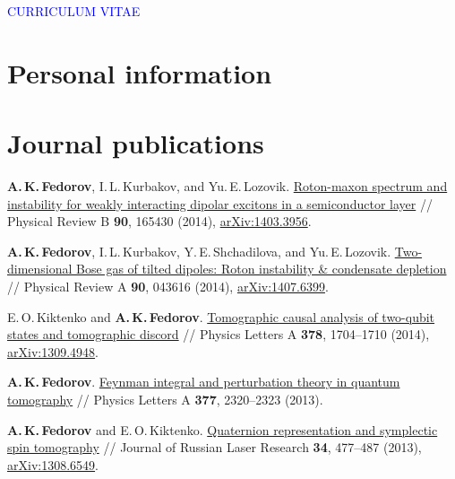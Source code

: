 \documentclass[10pt,a4paper,sans]{moderncv}
\begin{document}
\begin{center}
\Large
\textcolor{blue}{CURRICULUM VITAE}
\end{center}

\section{Personal information}


\section{Journal publications}

	{\textbf{A.\,K.\,Fedorov}, I.\,L.\,Kurbakov, and Yu.\,E.\,Lozovik. 
	{\textcolor{blue}{\href{http://dx.doi.org/10.1103/PhysRevB.90.165430}{Roton-maxon spectrum and instability for weakly interacting dipolar excitons in a semiconductor layer}}}
	// Physical Review B \textbf{90}, 165430 (2014),
	{\textcolor{blue}{\href{http://arxiv.org/abs/1403.3956}{arXiv:1403.3956}}}.}
	
	{\textbf{A.\,K.\,Fedorov}, I.\,L.\,Kurbakov, Y.\,E.\,Shchadilova, and Yu.\,E.\,Lozovik.
	{\textcolor{blue}{\href{http://dx.doi.org/10.1103/PhysRevA.90.043616}{Two-dimensional Bose gas of tilted dipoles: Roton instability \& condensate depletion}}}
	// Physical Review A \textbf{90}, 043616 (2014),
	{\textcolor{blue}{\href{http://arxiv.org/abs/1407.6399}{arXiv:1407.6399}}}.}

	{E.\,O.\,Kiktenko and \textbf{A.\,K.\,Fedorov}. 
	{\textcolor{blue}{\href{http://dx.doi.org/10.1016/j.physleta.2014.04.036}{Tomographic causal analysis of two-qubit states and tomographic discord}}} //  
	Physics Letters A \textbf{378},  1704--1710 (2014), {\textcolor{blue}{\href{http://arxiv.org/abs/1309.4948}{arXiv:1309.4948}}}.}

	{\textbf{A.\,K.\,Fedorov}. 
	{\textcolor{blue}{\href{http://dx.doi.org/10.1016/j.physleta.2013.07.020}{Feynman integral and perturbation theory in quantum tomography}}} // 
	Physics Letters A \textbf{377},  2320--2323 (2013).}
	
	{\textbf{A.\,K.\,Fedorov} and E.\,O.\,Kiktenko. 
	{\textcolor{blue}{\href{http://dx.doi.org/10.1007/s10946-013-9378-z}{Quaternion representation and symplectic spin tomography}}} // 
	Journal of Russian Laser Research \textbf{34}, 477--487 (2013), 
	{\textcolor{blue}{\href{http://arxiv.org/abs/1308.6549}{arXiv:1308.6549}}}.}
	
\end{document}
